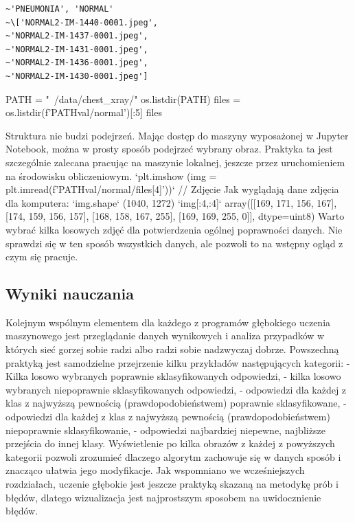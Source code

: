 \documentclass[12pt,a4paper,twoside,titlepage,openright]{book}
\begin{document}
\noindent
\begin{minipage}{\linewidth}
\begin{lstlisting}[caption=Podgląd danych, label=lst:test]
~'PNEUMONIA', 'NORMAL'
~\['NORMAL2-IM-1440-0001.jpeg',
~'NORMAL2-IM-1437-0001.jpeg',
~'NORMAL2-IM-1431-0001.jpeg',
~'NORMAL2-IM-1436-0001.jpeg',
~'NORMAL2-IM-1430-0001.jpeg']
\end{lstlisting}
\end{minipage}

PATH = "~/data/chest_xray/"
os.listdir(PATH)
files = os.listdir(f'{PATH}val/normal')[:5]
files


Struktura nie budzi podejrzeń. Mając dostęp do maszyny wyposażonej w Jupyter Notebook, można w prosty sposób podejrzeć wybrany obraz. Praktyka ta jest szczególnie zalecana pracując na maszynie lokalnej, jeszcze przez uruchomieniem na środowisku obliczeniowym.
`plt.imshow (img = plt.imread(f'{PATH}val/normal/{files[4]}’))`
// Zdjęcie
Jak wyglądają dane zdjęcia dla komputera:
`img.shape`
(1040, 1272)
`img[:4,:4]`
array([[169, 171, 156, 167],
       [174, 159, 156, 157],
       [168, 158, 167, 255],
       [169, 169, 255,   0]], dtype=uint8)
Warto wybrać kilka losowych zdjęć dla potwierdzenia ogólnej poprawności danych. Nie sprawdzi się w ten sposób wszystkich danych, ale pozwoli to na wstępny ogląd z czym się pracuje.





\subsection{Wyniki nauczania}
Kolejnym wspólnym elementem dla każdego z programów głębokiego uczenia maszynowego jest przeglądanie danych wynikowych i analiza przypadków w których sieć gorzej sobie radzi albo radzi sobie nadzwyczaj dobrze. Powszechną praktyką jest samodzielne przejrzenie kilku przykładów następujących kategorii:
- Kilka losowo wybranych poprawnie sklasyfikowanych odpowiedzi,
- kilka losowo wybranych niepoprawnie sklasyfikowanych odpowiedzi,
- odpowiedzi dla każdej z klas z najwyższą pewnością (prawdopodobieństwem) poprawnie sklasyfikowane,
- odpowiedzi dla każdej z klas z najwyższą pewnością (prawdopodobieństwem) niepoprawnie sklasyfikowanie,
- odpowiedzi najbardziej niepewne, najbliższe przejścia do innej klasy.
Wyświetlenie po kilka obrazów z każdej z powyższych kategorii pozwoli zrozumieć dlaczego algorytm zachowuje się w danych sposób i znacząco ułatwia jego modyfikacje. Jak wspomniano we wcześniejszych rozdziałach, uczenie głębokie jest jeszcze praktyką skazaną na metodykę prób i błędów, dlatego wizualizacja jest najprostszym sposobem na uwidocznienie błędów.
\end{document}
